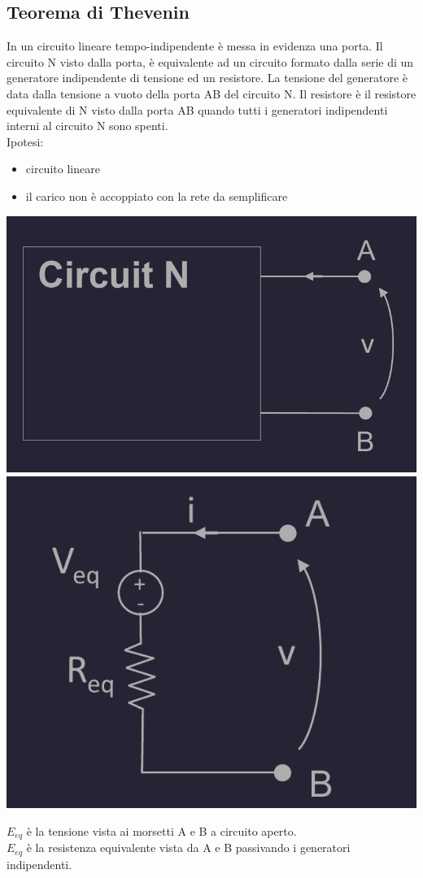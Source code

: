 \documentclass{article}
\begin{document}
\subsection{Teorema di Thevenin}
In un circuito lineare tempo-indipendente è messa in evidenza una porta. Il circuito N visto dalla porta, è equivalente ad un circuito formato dalla serie di un generatore indipendente di tensione ed un resistore. La tensione del generatore è data dalla tensione a vuoto
della porta AB del circuito N. Il resistore è il resistore equivalente di N visto dalla porta AB quando tutti i generatori indipendenti interni al circuito N sono spenti.
\vspace*{0.2cm}\\
Ipotesi:
\begin{itemize}
    \item circuito lineare
    \item il carico non è accoppiato con la rete da semplificare
\end{itemize}
\begin{center}
    \includegraphics[scale=0.3]{Image/Thevenin_1.png}
    \includegraphics[scale=0.3]{Image/Thevenin_2.png}
\end{center}
$E_{eq}$ è la tensione vista ai morsetti A e B a circuito aperto.\\
$E_{eq}$ è la resistenza equivalente vista da A e B passivando i generatori indipendenti.
\end{document}
